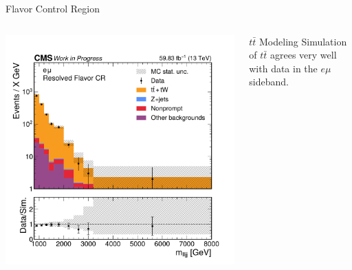 \documentclass[aspectratio=169]{beamer}
\begin{document}
\begin{frame}{Flavor Control Region}
  \begin{columns}
    \begin{column}{0.50\textwidth}
      \centering
      \includegraphics[width=\textwidth]{../figures/plots/mass-fourobject-flavorcr.pdf}
    \end{column}
    \begin{column}{0.50\textwidth}
        \vspace*{-15mm}
        \centering
        \resizebox{\columnwidth}{!}{%
        }
      \vspace{1ex} 
      \begin{block}{$t\bar{t}$ Modeling}
        Simulation of $t\bar{t}$ agrees very well with data in the $e\mu$ sideband.
      \end{block}
    \end{column}
  \end{columns}
\end{frame}
\end{document}
